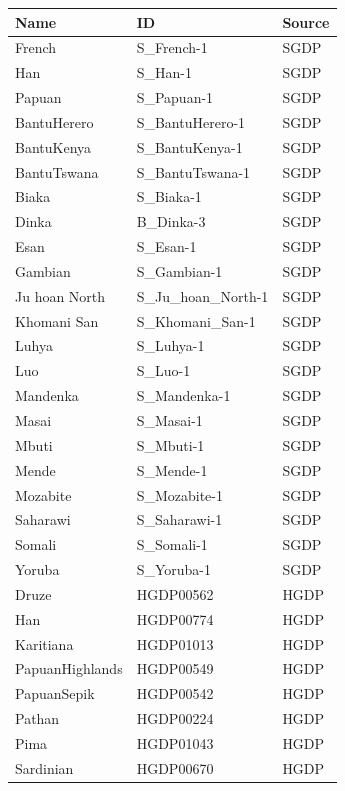 \begin{table}[ht]
    \centering
    \begin{tabular}{lll}
      \hline
    Name & ID & Source \\ 
      \hline
    French & S\_French-1 & SGDP \\ 
      Han & S\_Han-1 & SGDP \\ 
      Papuan & S\_Papuan-1 & SGDP \\ 
      BantuHerero & S\_BantuHerero-1 & SGDP \\ 
      BantuKenya & S\_BantuKenya-1 & SGDP \\ 
      BantuTswana & S\_BantuTswana-1 & SGDP \\ 
      Biaka & S\_Biaka-1 & SGDP \\ 
      Dinka & B\_Dinka-3 & SGDP \\ 
      Esan & S\_Esan-1 & SGDP \\ 
      Gambian & S\_Gambian-1 & SGDP \\ 
      Ju hoan North & S\_Ju\_hoan\_North-1 & SGDP \\ 
      Khomani San & S\_Khomani\_San-1 & SGDP \\ 
      Luhya & S\_Luhya-1 & SGDP \\ 
      Luo & S\_Luo-1 & SGDP \\ 
      Mandenka & S\_Mandenka-1 & SGDP \\ 
      Masai & S\_Masai-1 & SGDP \\ 
      Mbuti & S\_Mbuti-1 & SGDP \\ 
      Mende & S\_Mende-1 & SGDP \\ 
      Mozabite & S\_Mozabite-1 & SGDP \\ 
      Saharawi & S\_Saharawi-1 & SGDP \\ 
      Somali & S\_Somali-1 & SGDP \\ 
      Yoruba & S\_Yoruba-1 & SGDP \\ 
      Druze & HGDP00562 & HGDP \\ 
      Han & HGDP00774 & HGDP \\ 
      Karitiana & HGDP01013 & HGDP \\ 
      PapuanHighlands & HGDP00549 & HGDP \\ 
      PapuanSepik & HGDP00542 & HGDP \\ 
      Pathan & HGDP00224 & HGDP \\ 
      Pima & HGDP01043 & HGDP \\ 
      Sardinian & HGDP00670 & HGDP \\ 

\end{tabular}
\end{table}
